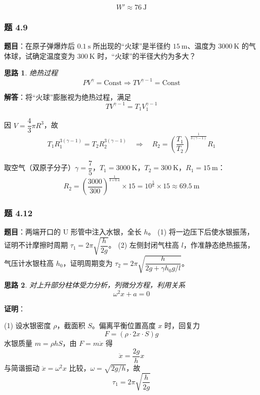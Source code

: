 \documentclass[UTF8]{ctexart}
\newtheorem{thoughts}{思路}[subsection]
\begin{document}
\[
\boxed{W'\approx 76\ \mathrm{J}}
\]

\subsubsection{题 4.9}

\textbf{题目}：在原子弹爆炸后 $0.1\ \mathrm{s}$ 所出现的“火球”是半径约 $15\ \mathrm{m}$、温度为 $3000\ \mathrm{K}$ 的气体球，试确定温度变为 $300\ \mathrm{K}$ 时，“火球”的半径大约为多大？

\begin{thoughts}
  绝热过程$$PV^\gamma = \text{Const} \Rightarrow TV^{\gamma-1} = \text{Const}$$
\end{thoughts}

\textbf{解答}：将“火球”膨胀视为绝热过程，满足
\[
TV^{\gamma-1}=T_1V_1^{\gamma-1}
\]

因 $V=\dfrac{4}{3}\pi R^3$，故
\[
T_1R_1^{3(\gamma-1)}=T_2R_2^{3(\gamma-1)}
\quad\Longrightarrow\quad
R_2=\left(\frac{T_1}{T_2}\right)^{\frac{1}{3(\gamma-1)}}R_1
\]

取空气（双原子分子）$\gamma=\dfrac{7}{5}$，$T_1=3000\ \mathrm{K}$，$T_2=300\ \mathrm{K}$，$R_1=15\ \mathrm{m}$：
\[
R_2=\left(\frac{3000}{300}\right)^{\frac{1}{3\times 0.4}}\times 15
=10^{\frac{5}{6}}\times 15\approx 69.5\ \mathrm{m}
\]


\subsubsection{题 4.12}

\textbf{题目}：两端开口的 U 形管中注入水银，全长 $h$。
(1) 将一边压下后使水银振荡，证明不计摩擦时周期 $\tau_1=2\pi\sqrt{\dfrac{h}{2g}}$。
(2) 左侧封闭气柱高 $l$，作准静态绝热振荡，气压计水银柱高 $h_0$，证明周期变为
$\tau_2=2\pi\sqrt{\dfrac{h}{2g+\gamma h_0g/l}}$。

\begin{thoughts}
  对上升部分柱体受力分析，列微分方程，利用关系$$\omega^2x + a=0$$
\end{thoughts}

\textbf{证明}：

(1) 设水银密度 $\rho$，截面积 $S$。偏离平衡位置高度 $x$ 时，回复力
\[
F=(\rho\cdot 2x\cdot S)g
\]
水银质量 $m=\rho hS$，由 $F=m\ddot{x}$ 得
\[
\ddot{x}=\frac{2g}{h}x
\]
与简谐振动 $\ddot{x}=\omega^2x$ 比较，$\omega=\sqrt{2g/h}$，故
\[
\boxed{\tau_1=2\pi\sqrt{\frac{h}{2g}}}
\]
\end{document}
